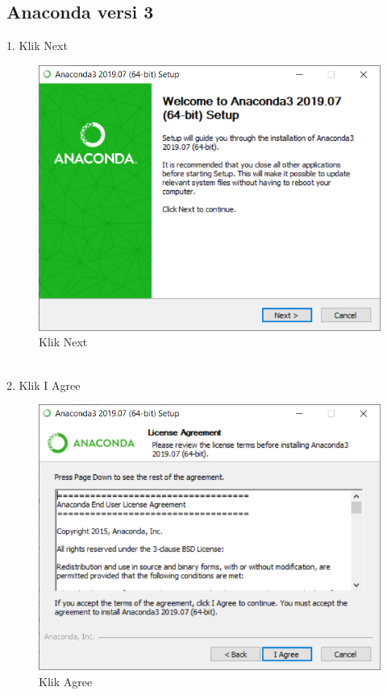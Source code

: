 \documentclass[12pt, times new roman, a4paper]{article}
\begin{document}
\subsection{Anaconda versi 3}
1. Klik Next\\ 
\begin{figure}[h]
	\centering
		\includegraphics[scale=0.5]{Gambar/A1}
	\caption{Klik Next}
\end{figure}
\\
2. Klik I Agree\\
\begin{figure}[h]
	\centering
		\includegraphics[scale=0.5]{Gambar/A2}
	\caption{Klik Agree}
\end{figure}
\end{document}
